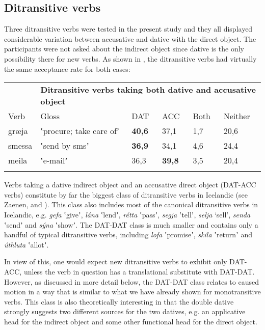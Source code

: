 \subsection{Ditransitive verbs} %

Three ditransitive verbs were tested in the present study and they all displayed considerable variation between accusative and dative with the direct object. The participants were not asked about the indirect object since dative is the only possibility there for new verbs. As shown in , the ditransitive verbs had virtually the same acceptance rate for both cases:

\tablefirsthead{}

\tabletail{}
\tablelasttail{}
\begin{tabularx}{\textwidth}{XXXXXX}
\lsptoprule

\multicolumn{1}{X}{{\bfseries \tabref{tab:key:5}:}} & \multicolumn{5}{X}{{\bfseries Ditransitive verbs taking both dative and accusative object}}\\
Verb & Gloss & DAT & ACC & Both & Neither\\
græja & ʽprocure; take care ofʼ & \textbf{40,6} & 37,1 & 1,7 & 20,6\\
smessa & ʽsend by smsʼ & \textbf{36,9} & 34,1 & 4,6 & 24,4\\
meila & ʽe-mailʼ & 36,3 & \textbf{39,8} & 3,5 & 20,4\\
\lspbottomrule
\end{tabularx}
Verbs taking a dative indirect object and an accusative direct object (DAT-ACC verbs) constitute by far the biggest class of ditransitive verbs in Icelandic (see Zaenen, \citealt{MalingThráinsson1985} and \citealt{Jónsson2000}). This class also includes most of the canonical ditransitive verbs in Icelandic, e.g. \textit{gefa} ʽgiveʼ, \textit{lána} ʽlendʼ, \textit{rétta} ʽpassʼ, \textit{segja} ʽtellʼ, \textit{selja} ‘sell’, \textit{senda} ʽsendʼ and \textit{sýna} ʽshowʼ. The DAT-DAT class is much smaller and contains only a handful of typical ditransitive verbs, including \textit{lofa} ʽpromiseʼ, \textit{skila} ʽreturnʼ and \textit{úthluta} ʽallotʼ. 

In view of this, one would expect new ditransitive verbs to exhibit only DAT-ACC, unless the verb in question has a translational substitute with DAT-DAT. However, as discussed in more detail below, the DAT-DAT class relates to caused motion in a way that is similar to what we have already shown for monotransitive verbs. This class is also theoretically interesting in that the double dative strongly suggests two different sources for the two datives, e.g. an applicative head for the indirect object and some other functional head for the direct object. 

